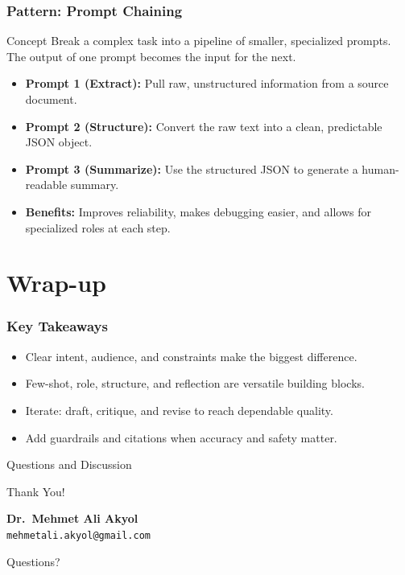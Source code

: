 \documentclass{beamer}
\begin{document}
\begin{frame}
	\frametitle{Pattern: Prompt Chaining}
	\begin{block}{Concept}
		Break a complex task into a pipeline of smaller, specialized prompts. The output of one prompt becomes the input for the next.
	\end{block}
	\begin{itemize}
		\item \textbf{Prompt 1 (Extract):} Pull raw, unstructured information from a source document.
		\item \textbf{Prompt 2 (Structure):} Convert the raw text into a clean, predictable JSON object.
		\item \textbf{Prompt 3 (Summarize):} Use the structured JSON to generate a human-readable summary.
		\item \textbf{Benefits:} Improves reliability, makes debugging easier, and allows for specialized roles at each step.
	\end{itemize}
\end{frame}


\section{Wrap-up}

\begin{frame}
	\frametitle{Key Takeaways}
	\begin{itemize}
		\item Clear intent, audience, and constraints make the biggest difference.
		\item Few-shot, role, structure, and reflection are versatile building blocks.
		\item Iterate: draft, critique, and revise to reach dependable quality.
		\item Add guardrails and citations when accuracy and safety matter.
	\end{itemize}
\end{frame}

\begin{frame}{Questions and Discussion}
	\begin{center}
	{\Huge Thank You!}
	\vspace{1cm}

		\textbf{Dr.\ Mehmet Ali Akyol}\\
		\texttt{mehmetali.akyol@gmail.com}
	\vspace{1cm}

	{\large Questions?}
	\end{center}
\end{frame}
\end{document}
